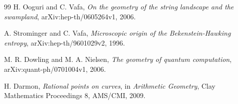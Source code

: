 \documentclass[11pt]{article}
\begin{document}
\begin{thebibliography}{99}
H. Ooguri and C. Vafa, \emph{On the geometry of the string landscape and the swampland}, arXiv:hep-th/0605264v1, 2006.

A. Strominger and C. Vafa, \emph{Microscopic origin of the Bekenstein-Hawking entropy}, arXiv:hep-th/9601029v2, 1996.

M. R. Dowling and M. A. Nielsen, \emph{The geometry of quantum computation}, arXiv:quant-ph/0701004v1, 2006.

H. Darmon, \emph{Rational points on curves}, in \emph{Arithmetic Geometry}, Clay Mathematics Proceedings 8, AMS/CMI, 2009.

\end{thebibliography}
\end{document}
